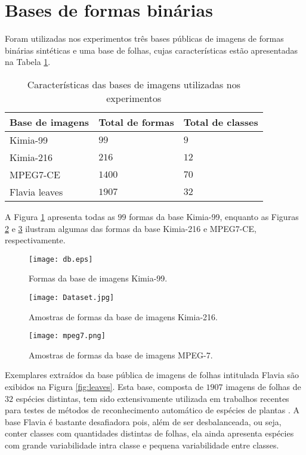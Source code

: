 \section{Bases de formas binárias}

Foram utilizadas nos experimentos três bases públicas de imagens de formas binárias sintéticas e uma base de folhas, cujas características estão apresentadas na Tabela \ref{tbl:bases}.

\begin{table}[]
	\centering
	\caption{Características das bases de imagens utilizadas nos experimentos}
	\label{tbl:bases}
	\begin{tabular}{lll}
		\toprule
		Base de imagens       & Total de formas & Total de classes \\
		\midrule
		Kimia-99      & $99$   & $9$     \\
		Kimia-216     & $216$  & $12$    \\
		MPEG7-CE      & $1400$ & $70$    \\
		Flavia leaves & $1907$ & $32$\\
		\bottomrule
	\end{tabular}
\end{table}

A Figura \ref{fig:db1} apresenta todas as $99$ formas da base Kimia-99, enquanto as Figuras \ref{fig:db2} e \ref{fig:db3} ilustram algumas das formas da base Kimia-216 e MPEG7-CE, respectivamente.

\begin{figure}[h!]
	\caption{\label{fig:db1} Formas da base de imagens Kimia-99.}
	\centering
	\texttt{[image: db.eps]}
\end{figure}

\begin{figure}[h!]
	\caption{\label{fig:db2} Amostras de formas da base de imagens Kimia-216.}
	\centering
	\texttt{[image: Dataset.jpg]}
\end{figure}

\begin{figure}[h!]
	\caption{\label{fig:db3} Amostras de formas da base de imagens MPEG-7.}
	\centering
	\texttt{[image: mpeg7.png]}
\end{figure}

Exemplares extraídos da base pública de imagens de folhas intitulada Flavia \cite{4458016} são exibidos na Figura \ref{fig:leaves}. Esta base, composta de  $1907$ imagens de folhas de $32$ espécies distintas, tem sido extensivamente utilizada em trabalhos recentes para testes de métodos de reconhecimento automático de espécies de plantas \cite{wang2015march,quteprints78723,Quadri:2015,Chaki201561}. A base Flavia é bastante desafiadora pois, além de ser desbalanceada, ou seja,  conter classes com quantidades distintas de folhas, ela ainda apresenta espécies com grande variabilidade intra classe e pequena variabilidade entre classes. 



